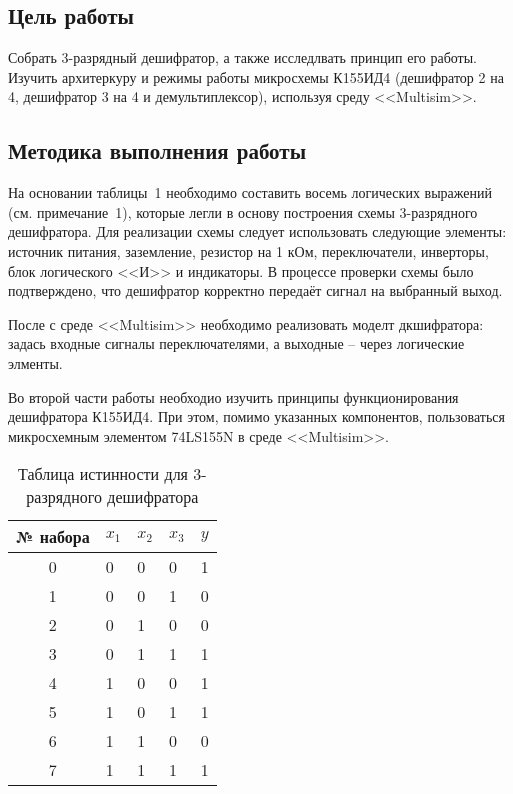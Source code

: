 \subsection*{Цель работы}

Собрать 3-разрядный дешифратор, а также исследлвать принцип его работы.  Изучить архитеркуру и режимы работы микросхемы К155ИД4 (дешифратор 2 на 4, дешифратор 3 на 4 и демультиплексор), используя среду <<Multisim>>.

\subsection*{Методика выполнения работы}

На основании таблицы~1 необходимо составить восемь логических выражений (см. примечание~1), которые легли в основу построения схемы 3-разрядного дешифратора.  
Для реализации схемы следует использовать следующие элементы: источник питания, заземление, резистор на 1 кОм, переключатели, инверторы, блок логического <<И>> и индикаторы. В процессе проверки схемы было подтверждено, что дешифратор корректно передаёт сигнал на выбранный выход.

После с среде <<Multisim>> необходимо реализовать моделт дкшифратора: задась входные сигналы переключателями, а выходные -- через логические элменты.

Во второй части работы необходио изучить принципы функционирования дешифратора К155ИД4. При этом, помимо указанных компонентов, пользоваться микросхемным элементом 74LS155N в среде <<Multisim>>.

\begin{table}[h!]
\centering
\caption{Таблица истинности для 3-разрядного дешифратора}
\begin{tabularx}{\textwidth}{|c|X|X|X|X|}
\hline
№ набора & $x_{1}$ & $x_{2}$ & $x_{3}$ & $y$ \\ \hline
0 & 0 & 0 & 0 & 1 \\ \hline
1 & 0 & 0 & 1 & 0 \\ \hline
2 & 0 & 1 & 0 & 0 \\ \hline
3 & 0 & 1 & 1 & 1 \\ \hline
4 & 1 & 0 & 0 & 1 \\ \hline
5 & 1 & 0 & 1 & 1 \\ \hline
6 & 1 & 1 & 0 & 0 \\ \hline
7 & 1 & 1 & 1 & 1 \\ \hline
\end{tabularx}
\end{table}

